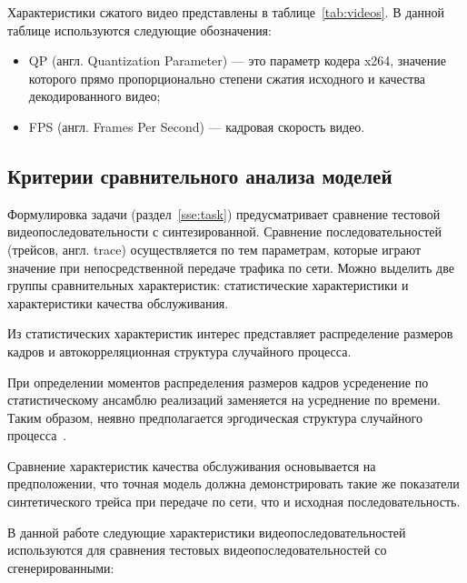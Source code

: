 Характеристики сжатого видео представлены в таблице~\ref{tab:videos}.
В данной таблице используются следующие обозначения:
\begin{itemize}
    \item QP (англ. Quantization Parameter) --- это параметр кодера x264,
        значение которого прямо пропорционально степени сжатия исходного
        и качества декодированного видео;
    \item FPS (англ. Frames Per Second) --- кадровая скорость видео.
\end{itemize}


\subsection{Критерии сравнительного анализа моделей}

Формулировка задачи (раздел~\ref{sse:task}) предусматривает
сравнение тестовой видеопоследовательности с синтезированной.
Сравнение последовательностей (трейсов, англ. trace) осуществляется
по тем параметрам, которые играют значение при непосредственной
передаче трафика по сети. Можно выделить две группы сравнительных
характеристик: статистические характеристики и характеристики качества
обслуживания.

Из статистических характеристик интерес представляет распределение
размеров кадров и автокорреляционная структура случайного процесса.

При определении моментов распределения размеров кадров усреденение
по статистическому ансамблю реализаций заменяется на усреднение
по времени. Таким образом, неявно предполагается эргодическая
структура случайного процесса~\cite{ergodic}.

Сравнение характеристик качества обслуживания основывается
на предположении, что точная модель должна демонстрировать
такие же показатели синтетического трейса при передаче по
сети, что и исходная последовательность.

В данной работе следующие характеристики видеопоследовательностей
используются для сравнения тестовых видеопоследовательностей
со сгенерированными:

